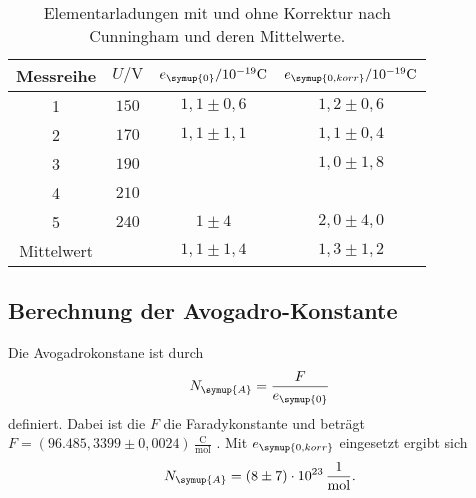 \begin{table}
  \centering
  \caption{Elementarladungen mit und ohne Korrektur nach Cunningham und deren Mittelwerte.}
  \label{tab:e}
  \begin{tabular}{c c c c}
    \toprule
    Messreihe & $U/\si{\volt}$ & $e_{\symup{0}}/10^{-19}\si{\coulomb}$ & $e_{\symup{0, korr}}/10^{-19}
    \si{\coulomb}$ \\
    \midrule
    1           & $150$ & $1,1 \pm 0,6$ & $1,2 \pm 0,6$ \\
    2           & $170$ & $1,1 \pm 1,1$ & $1,1 \pm 0,4$ \\
    3           & $190$ &               & $1,0 \pm 1,8$ \\
    4           & $210$ &               &               \\
    5           & $240$ & $1 \pm 4$     & $2,0 \pm 4,0$ \\
    Mittelwert  &       & $1,1 \pm 1,4$ & $1,3 \pm 1,2$ \\
    \bottomrule
  \end{tabular}
\end{table}

\subsection{Berechnung der Avogadro-Konstante}
\label{sec:Avogadro}
Die Avogadrokonstane ist durch
\begin{align*}
  N_{\symup{A}} = \frac{F}{e_{\symup{0}}}
\end{align*}
definiert. Dabei ist die $F$ die Faradykonstante und beträgt $F= (96.485,3399 \pm 0,0024)\,\frac{\si{\coulomb}}
{\si{\mol}}$ \cite{faraday}. Mit $e_{\symup{0, korr}}$ eingesetzt ergibt sich
\begin{align*}
  N_{\symup{A}} = (8 \pm 7)\cdot 10^{23} \, \frac{1}{\si{\mol}}.
\end{align*}
